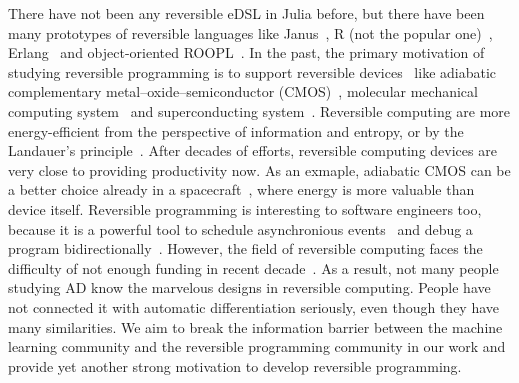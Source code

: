\documentclass{article}
\newcommand{\<}{\langle}
\renewcommand{\>}{\rangle}
\theoremstyle{definition}\newtheorem{definition}{\textit{Definition}}
\begin{document}
There have not been any reversible eDSL in Julia before, but there have been many prototypes of reversible languages like Janus~\cite{Lutz1986}, R (not the popular one)~\cite{Frank1997}, Erlang~\cite{Lanese2018} and object-oriented ROOPL~\cite{Haulund2017}. %
    In the past, the primary motivation of studying reversible programming is to support reversible devices~\cite{Frank1999} like adiabatic complementary metal–oxide–semiconductor (CMOS)~\cite{Koller1992}, molecular mechanical computing system~\cite{Merkle2018} and superconducting system~\cite{Likharev1977,Semenov2003}.
    Reversible computing are more energy-efficient from the perspective of information and entropy, or by the Landauer's principle~\cite{Landauer1961}.
    After decades of efforts, reversible computing devices are very close to providing productivity now. As an exmaple, adiabatic CMOS can be a better choice already in a spacecraft~\cite{Hanninen2014, Debenedictis2017}, where energy is more valuable than device itself.
    Reversible programming is interesting to software engineers too, because it is a powerful tool to schedule asynchronious events~\cite{Jefferson1985} and debug a program bidirectionally~\cite{Boothe2000}.
    However, the field of reversible computing faces the difficulty of not enough funding in recent decade~\cite{Frank2017}. As a result, not many people studying AD know the marvelous designs in reversible computing. People have not connected it with automatic differentiation seriously, even though they have many similarities. We aim to break the information barrier between the machine learning community and the reversible programming community in our work and provide yet another strong motivation to develop reversible programming.
\end{document}
